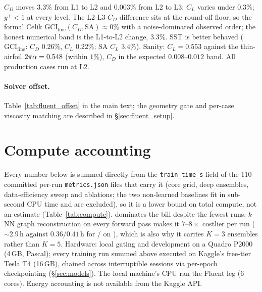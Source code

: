 $C_D$ moves $3.3\%$ from L1 to L2 and $0.003\%$ from L2 to L3; $C_L$ varies
under $0.3\%$; $y^+<1$ at every level. The L2-L3 $C_D$ difference sits at the
round-off floor, so the formal Celik $\mathrm{GCI}_{\text{fine}}(C_D,
\mathrm{SA})\approx0\%$ with a noise-dominated observed order; the honest
numerical band is the L1-to-L2 change, $3.3\%$. SST is better behaved
($\mathrm{GCI}_{\text{fine}}$: $C_D$ $0.26\%$, $C_L$ $0.22\%$; SA $C_L$
$3.4\%$). Sanity: $C_L=0.553$ against the thin-airfoil $2\pi\alpha=0.548$
(within $1\%$), $C_D$ in the expected $0.008$--$0.012$ band. All production
cases run at L2.

\paragraph{Solver offset.} Table~\ref{tab:fluent_offset} in the main text;
the geometry gate and per-case viscosity matching are described in
\S\ref{sec:fluent_setup}.

\begin{widetable}
  
\end{widetable}

\begin{widetable}
  
\end{widetable}

\FloatBarrier

\section{Compute accounting}
\label{app:compute}
Every number below is summed directly from the \texttt{train\_time\_s} field
of the 110 committed per-run \texttt{metrics.json} files that carry
it (core grid, deep ensembles, data-efficiency sweep and ablations; the two
non-learned baselines fit in sub-second CPU time and are excluded), so it is
a lower bound on total compute, not an estimate (Table~\ref{tab:compute}).
\Mgnn{} dominates the bill despite the fewest runs: $k$NN graph
reconstruction on every forward pass makes it $7$--$8\times$ costlier per run
($\sim$2.9\,h against $0.36$/$0.41$\,h for \Mfno/\Mtrans{} on
), which is also why it carries $K=3$ ensembles rather than
$K=5$. Hardware: local gating and development on a Quadro P2000 (4\,GB,
Pascal); every training run summed above executed on Kaggle's free-tier Tesla
T4 (16\,GB), chained across interruptible sessions via per-epoch
checkpointing (\S\ref{sec:models}). The local machine's CPU ran the Fluent
leg (6 cores). Energy accounting is not available from the Kaggle API.

